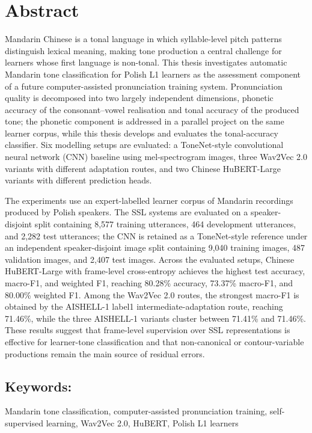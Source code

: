 \chapter*{Abstract}

Mandarin Chinese is a tonal language in which syllable-level pitch patterns distinguish lexical meaning, making tone production a central challenge for learners whose first language is non-tonal. This thesis investigates automatic Mandarin tone classification for Polish L1 learners as the assessment component of a future computer-assisted pronunciation training system. Pronunciation quality is decomposed into two largely independent dimensions, phonetic accuracy of the consonant--vowel realisation and tonal accuracy of the produced tone; the phonetic component is addressed in a parallel project on the same learner corpus, while this thesis develops and evaluates the tonal-accuracy classifier. Six modelling setups are evaluated: a ToneNet-style convolutional neural network (CNN) baseline using mel-spectrogram images, three Wav2Vec 2.0 variants with different adaptation routes, and two Chinese HuBERT-Large variants with different prediction heads.

The experiments use an expert-labelled learner corpus of Mandarin recordings produced by Polish speakers. The SSL systems are evaluated on a speaker-disjoint split containing 8,577 training utterances, 464 development utterances, and 2,282 test utterances; the CNN is retained as a ToneNet-style reference under an independent speaker-disjoint image split containing 9,040 training images, 487 validation images, and 2,407 test images. Across the evaluated setups, Chinese HuBERT-Large with frame-level cross-entropy achieves the highest test accuracy, macro-F1, and weighted F1, reaching 80.28\% accuracy, 73.37\% macro-F1, and 80.00\% weighted F1. Among the Wav2Vec 2.0 routes, the strongest macro-F1 is obtained by the AISHELL-1 label1 intermediate-adaptation route, reaching 71.46\%, while the three AISHELL-1 variants cluster between 71.41\% and 71.46\%. These results suggest that frame-level supervision over SSL representations is effective for learner-tone classification and that non-canonical or contour-variable productions remain the main source of residual errors.

\section*{Keywords:}
\noindent Mandarin tone classification, computer-assisted pronunciation training, self-supervised learning, Wav2Vec 2.0, HuBERT, Polish L1 learners
